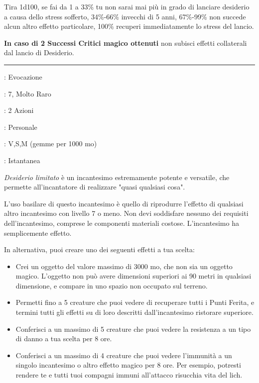 \begin{multicols}{2}
Tira 1d100, se fai da 1 a 33\% tu non sarai mai più in grado di lanciare desiderio a causa dello stress sofferto, 34\%-66\% invecchi di 5 anni, 67\%-99\% non succede alcun altro effetto particolare, 100\% recuperi immediatamente lo stress del lancio.

\textbf{In caso di 2 Successi Critici magico ottenuti} non subisci effetti collaterali dal lancio di Desiderio.


\smallskip\noindent\rule{\linewidth}{2pt} \hypertarget{Desiderio limitato}{}\smallskip{}
\noindent
\begin{description}[noitemsep, topsep=0pt, parsep=0pt, partopsep=0pt, leftmargin=0cm, labelwidth=2.8cm]
	\item[\textbf{Lista di Magia}]: Evocazione
	\item[\textbf{Livello}]: 7, Molto Raro
	\item[\textbf{T. di Lancio}]: 2 Azioni
	\item[\textbf{Gittata}]: Personale
	\item[\textbf{Componenti}]: V,S,M (gemme per 1000 mo)
	\item[\textbf{Durata}]: Istantanea
\end{description}

\emph{Desiderio limitato} è un incantesimo estremamente potente e versatile, che permette all'incantatore di realizzare "quasi qualsiasi cosa".

L'uso basilare di questo incantesimo è quello di riprodurre l'effetto di qualsiasi altro incantesimo con livello 7 o meno. Non devi soddisfare nessuno dei requisiti dell'incantesimo, comprese le componenti materiali costose. L'incantesimo ha semplicemente effetto.

In alternativa, puoi creare uno dei seguenti effetti a tua scelta:

\begin{itemize}[leftmargin=*] \setlength{\itemsep}{0pt}
	\item Crei un oggetto del valore massimo di 3000 mo, che non sia un oggetto magico. L'oggetto non può avere dimensioni superiori ai 90 metri in qualsiasi dimensione, e compare in uno spazio non occupato sul terreno.
	\item Permetti fino a 5 creature che puoi vedere di recuperare tutti i Punti Ferita, e termini tutti gli effetti su di loro descritti dall'incantesimo ristorare superiore.
	\item Conferisci a un massimo di 5 creature che puoi vedere la resistenza a un tipo di danno a tua scelta per 8 ore.
	\item Conferisci a un massimo di 4 creature che puoi vedere l'immunità a un singolo incantesimo o altro effetto magico per 8 ore. Per esempio, potresti rendere te e tutti tuoi compagni immuni all'attacco risucchia vita del lich.
\end{itemize}


\end{multicols}
